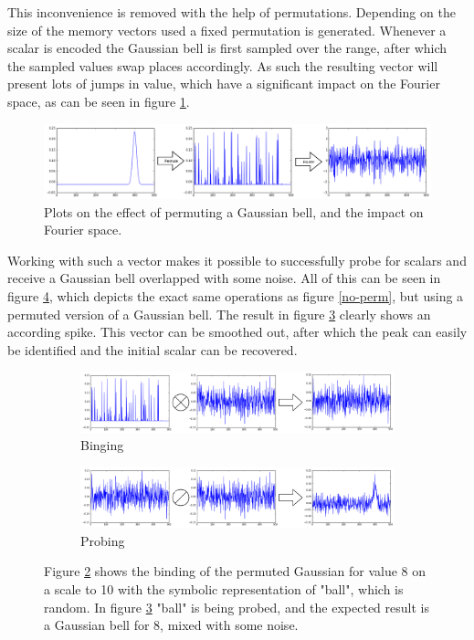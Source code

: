 \documentclass[conference]{IEEEtran}
\begin{document}
This inconvenience is removed with the help of permutations. Depending on the size of the memory vectors used a fixed permutation is generated. Whenever a scalar is encoded the Gaussian bell is first sampled over the range, after which the sampled values swap places accordingly. As such the resulting vector will present lots of jumps in value, which have a significant impact on the Fourier space, as can be seen in figure \ref{perm-fft}.

\begin{figure}
\includegraphics[width=\columnwidth]{img/scalar-perm-step-fft.png}
\caption{Plots on the effect of permuting a Gaussian bell, and the impact on Fourier space.}
\label{perm-fft}
\end{figure}

Working with such a vector makes it possible to successfully probe for scalars and receive a Gaussian bell overlapped with some noise. All of this can be seen in figure \ref{perm}, which depicts the exact same operations as figure \ref{no-perm}, but using a permuted version of a Gaussian bell. The result in figure \ref{perm-b} clearly shows an according spike. This vector can be smoothed out, after which the peak can easily be identified and the initial scalar can be recovered.

\begin{figure}
\begin{subfigure}{1\columnwidth}
\includegraphics[width=\columnwidth]{img/scalar-post-perm.png}
\caption{Binging}
\label{perm-a}
\end{subfigure}
\begin{subfigure}{1\columnwidth}
\includegraphics[width=\columnwidth]{img/scalar-post-perm-probe.png}
\caption{Probing}
\label{perm-b}
\end{subfigure}
\caption{Figure \ref{perm-a} shows the binding of the permuted Gaussian for value 8 on a scale to 10 with the symbolic representation of "ball", which is random. In figure \ref{perm-b} "ball" is being probed, and the expected result is a Gaussian bell for 8, mixed with some noise.}
\label{perm}
\end{figure}
\end{document}
